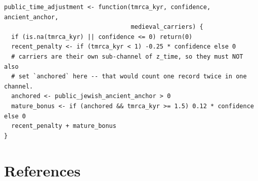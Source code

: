 \documentclass[11pt]{article}
\begin{document}
\begingroup\footnotesize
\begin{verbatim}
public_time_adjustment <- function(tmrca_kyr, confidence, ancient_anchor,
                                   medieval_carriers) {
  if (is.na(tmrca_kyr) || confidence <= 0) return(0)
  recent_penalty <- if (tmrca_kyr < 1) -0.25 * confidence else 0
  # carriers are their own sub-channel of z_time, so they must NOT also
  # set `anchored` here -- that would count one record twice in one channel.
  anchored <- public_jewish_ancient_anchor > 0
  mature_bonus <- if (anchored && tmrca_kyr >= 1.5) 0.12 * confidence else 0
  recent_penalty + mature_bonus
}
\end{verbatim}
\endgroup
\section*{References}
\end{document}

